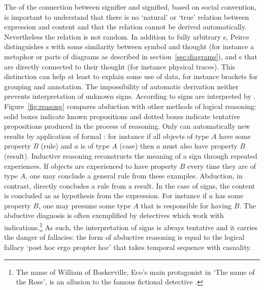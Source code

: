 The  of the connection between signifier and signified, based
on social convention, is important to understand that there is no `natural' or
`true' relation between expression and content and that the relation cannot be
derived automatically.  Nevertheless the relation is not random. In addition to
fully arbitrary s, Peirce distinguishes s
with some similarity between symbol and thought (for instance a metaphor or parts
of diagrams as described in section~\ref{sec:diagrams}), and
s that are directly connected to their thought (for
instance physical traces). This distinction can help at least to explain some
use of data, for instance brackets for grouping and annotation. The
impossibility of automatic derivation neither prevents interpretation of
unknown signs. According to \textcite[section 1.11]{Eco1984} signs are
interpreted by . Figure~\ref{fig:reasong} compares abduction
with other methods of logical reasoning: solid boxes indicate known
propositions and dotted boxes indicate tentative propositions produced in the
process of reasoning. Only  can automatically
 new results by application of formal : for
instance if all objects of type $A$ have some property $B$ (rule) and $a$ is of
type $A$ (case) then $a$ must also have property $B$ (result). Inductive
reasoning reconstructs the meaning of a sign through repeated experiences. If
objects are experienced to have property $B$ every time they are of type $A$,
one may conclude a general rule from these examples. Abduction, in contrast,
directly concludes a rule from a result. In the case of signs, the content is
concluded as as hypothesis from the expression.  For instance if $a$ has some
property $B$, one may presume some type $A$ that is responsible for having $B$.
The abductive diagnosis is often exemplified by detectives which work with
indications.\footnote{The name of William of Baskerville, Eco's main
protagonist in `The name of the Rose', is an allusion to the famous fictional
detective .} As such, the interpretation of signs is
always tentative and it carries the danger of fallacies: the form of abductive
reasoning is equal to the logical fallacy `post hoc ergo propter hoc' that
takes temporal sequence with casuality.

